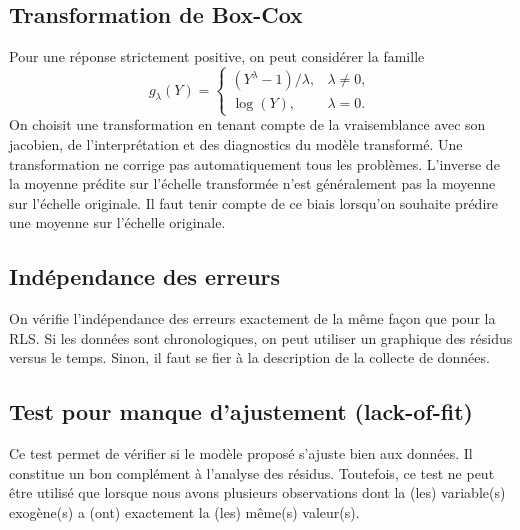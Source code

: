 \subsection{Transformation de Box-Cox}
\label{sec:LaTechniqueDeBoxCox}
Pour une réponse strictement positive, on peut considérer la famille
\[
 g_\lambda(Y)=\begin{cases}(Y^\lambda-1)/\lambda,&\lambda\ne0,\\
 \log(Y),&\lambda=0.\end{cases}
\]
On choisit une transformation en tenant compte de la vraisemblance avec son
jacobien, de l'interprétation et des diagnostics du modèle transformé.
Une transformation ne corrige pas automatiquement tous les problèmes.
L'inverse de la moyenne prédite sur l'échelle transformée n'est généralement
pas la moyenne sur l'échelle originale. Il faut tenir compte de ce biais
lorsqu'on souhaite prédire une moyenne sur l'échelle originale.

\subsection{Indépendance des erreurs}

On vérifie l'indépendance des erreurs exactement de la même façon que pour la RLS. Si les données sont chronologiques, on peut utiliser un graphique des résidus versus le temps. Sinon, il faut se fier à la description de la collecte de données.

\newpage
\subsection{Test pour manque d'ajustement (lack-of-fit)}
\label{sec:testAjustement}

Ce test permet de vérifier si le modèle proposé s'ajuste bien
aux données. Il constitue un bon complément à l'analyse des
résidus. Toutefois, ce test ne peut être utilisé que lorsque nous avons plusieurs observations dont la (les) variable(s) exogène(s) a (ont) exactement la (les) m\^eme(s) valeur(s).

